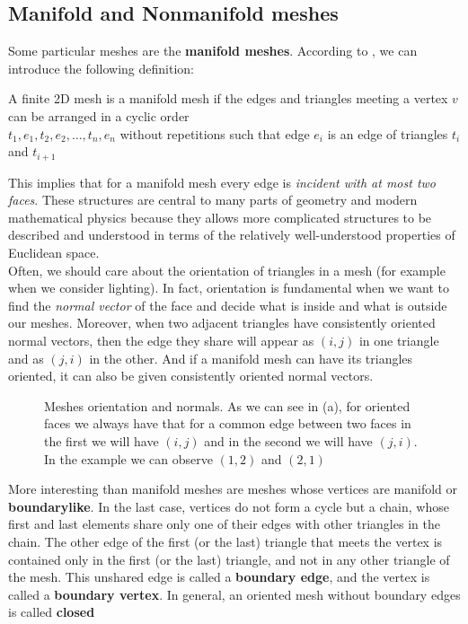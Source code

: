 \subsection{Manifold and Nonmanifold meshes}
Some particular meshes are the \textbf{manifold meshes}. According to \cite{Hughes}, we can introduce the following definition:

\begin{definition}
A finite 2D mesh is a manifold mesh if the edges and triangles meeting a vertex $v$ can be arranged in a cyclic order\\ $t_{1}, e_{1}, t_{2}, e_{2}, \dots, t_{n}, e_{n}$ without repetitions such that edge $e_{i}$ is an edge of triangles $t_{i}$ and $t_{i+1}$
\end{definition}

This implies that for a manifold mesh every edge is \textit{incident with at most two faces}. These structures are central to many parts of geometry and modern mathematical physics because they allows more complicated structures to be described and understood in terms of the relatively well-understood properties of Euclidean space.\\

Often, we should care about the orientation of triangles in a mesh (for example when we consider lighting). In fact, orientation is fundamental when we want to find the \textit{normal vector} of the face and decide what is inside and what is outside our meshes. Moreover, when two adjacent triangles have consistently oriented normal vectors, then the edge they share will appear as $(i, j)$ in one triangle and as $(j, i)$ in the other. And if a manifold mesh can have its triangles oriented, it can also be given consistently oriented normal vectors.\\

\begin{figure}[htb] %
   \centering
   
   \caption[Meshes orientation and normals]{Meshes orientation and normals. As we can see in (a), for oriented faces we always have that for a common edge between two faces in the first we will have $(i, j)$ and in the second we will have $(j , i)$. In the example we can observe $(1, 2)$ and $(2, 1)$}
   \label{fig:normals}
\end{figure}

More interesting than manifold meshes are meshes whose vertices are manifold or \textbf{boundarylike}. In the last case, vertices do not form a cycle but a chain, whose first and last elements share only one of their edges with other triangles in the chain. The other edge of the first (or the last) triangle that meets the vertex is contained only in the first (or the last) triangle, and not in any other triangle of the mesh. This unshared edge is called a \textbf{boundary edge}, and the vertex is called a \textbf{boundary vertex}. In general, an oriented mesh without boundary edges is called \textbf{closed}

